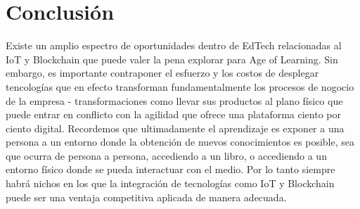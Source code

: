 \documentclass[conference]{IEEEtran}
\begin{document}
\section{Conclusión}
Existe un amplio espectro de oportunidades dentro de EdTech relacionadas al IoT y Blockchain que puede valer la pena explorar para Age of Learning. Sin embargo, es importante contraponer el esfuerzo y los costos de desplegar tencologías que en efecto transforman fundamentalmente los procesos de nogocio de la empresa - transformaciones como llevar sus productos al plano físico que puede entrar en conflicto con la agilidad que ofrece una plataforma ciento por ciento digital.
Recordemos que ultimadamente el aprendizaje es exponer a una persona a un entorno donde la obtención de nuevos conocimientos es posible, sea que ocurra de persona a persona, accediendo a un libro, o accediendo a un entorno físico donde se pueda interactuar con el medio. Por lo tanto siempre habrá nichos en los que la integración de tecnologías como IoT y Blockchain puede ser una ventaja competitiva aplicada de manera adecuada. \cite{kulkarni2025edtech}
\end{document}
